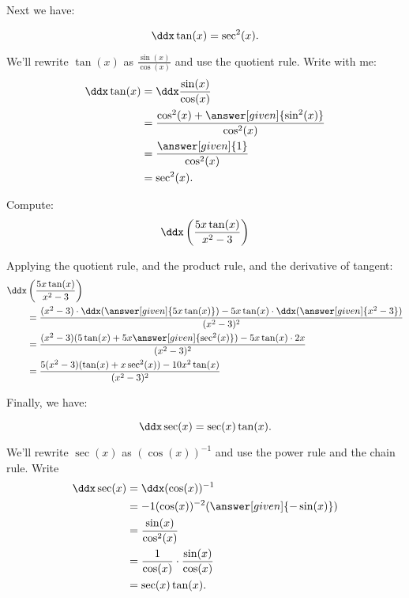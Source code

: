 \documentclass{ximera}
\begin{document}
Next we have:

\begin{theorem}
	\[ \ddx \tan(x) = \sec^2(x). \]

	\begin{explanation}
	
		We'll rewrite $\tan(x)$ as $\frac{\sin(x)}{\cos(x)}$ and use the
		quotient rule. Write with me:
		\begin{align*}
			\ddx\tan(x) &= \ddx\frac{\sin(x)}{\cos(x)}\\
				&=\frac{\cos^2(x) + \answer[given]{\sin^2(x)}}{\cos^2(x)}\\
				&=\frac{\answer[given]{1}}{\cos^2(x)}\\
				&=\sec^2(x).
		\end{align*}
	\end{explanation}
\end{theorem}

\begin{example}
Compute:
\[
\ddx \left( \frac{5x \tan(x)}{x^2 - 3} \right)
\]
\begin{explanation}
Applying the quotient rule, and the product rule, and the derivative
of tangent:
\begin{align*}
  \ddx &\left( \frac{5x \tan(x)}{x^2 - 3} \right) \\
  &= \frac{(x^2 - 3) \cdot \ddx(\answer[given]{5x \tan(x)}) - 5x \tan(x) \cdot \ddx (\answer[given]{x^2 - 3})}{(x^2 - 3)^2}  \\
  &= \frac{(x^2 - 3)(5 \tan(x) + 5x \answer[given]{\sec^2(x)}) - 5x \tan(x) \cdot 2x}{(x^2 - 3)^2}  \\
  &= \frac{5(x^2-3)(\tan(x)+x \sec^2(x)) - 10x^2 \tan(x)}{(x^2-3)^2}
\end{align*}
\end{explanation}
\end{example}

Finally, we have:

\begin{theorem}
\[
\ddx \sec(x) = \sec(x)\tan(x).
\]


\begin{explanation}
We'll rewrite $\sec(x)$ as $(\cos(x))^{-1}$ and use the power rule and the chain rule. Write
\begin{align*}
\ddx \sec(x) &= \ddx(\cos (x))^{-1}\\
&=-1(\cos(x))^{-2}(\answer[given]{-\sin(x)}) \\
&= \frac{\sin(x)}{\cos^2(x)} \\
&= \frac{1}{\cos(x)} \cdot \frac{\sin(x)}{\cos(x)}  \\
&= \sec(x)\tan(x).
\end{align*}
\end{explanation}
\end{theorem}
\end{document}
